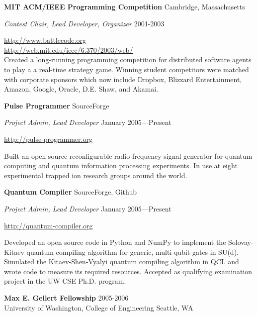 \documentclass[letter]{article}
\begin{document}
\vspace{\baselineskip}

{\bf MIT ACM/IEEE Programming Competition} \hfill Cambridge, Massachusetts

{\em Contest Chair, Lead Developer, Organizer} \hfill 2001-2003
\vspace{0.5\baselineskip}
\par

\url{http://www.battlecode.org}\\
\url{http://web.mit.edu/ieee/6.370/2003/web/}\\
Created a long-running
programming competition for distributed software agents to play a
a real-time strategy game. Winning student competitors were matched with
corporate sponsors which now include
Dropbox, Blizzard Entertainment, Amazon, Google, Oracle, D.E. Shaw, and Akamai.

\vspace{\baselineskip}
\par
{\bf {Pulse Programmer}} \hfill SourceForge
\par
{\em Project Admin, Lead Developer} \hfill January 2005---Present
\par
\url{http://pulse-programmer.org}
\par
Built an open source reconfigurable radio-frequency signal generator
for quantum computing and quantum information processing experiments.
In use at eight experimental trapped ion research groups around the world.

\vspace{\baselineskip}
\par
{\bf {Quantum Compiler}} \hfill SourceForge, Github
\par
{\em Project Admin, Lead Developer} \hfill January 2005---Present
\par
\url{http://quantum-compiler.org}
\par
Developed an open source code in Python and NumPy to implement the
Solovay-Kitaev quantum compiling algorithm for generic, multi-qubit gates
in SU(d). Simulated the Kitaev-Shen-Vyalyi quantum compiling algorithm in
QCL and wrote code to measure its required resources. Accepted as
qualifying examination project in the UW CSE Ph.D. program.

\vspace{\baselineskip}
\par
{\bf {Max E. Gellert Fellowship}} \hfill 2005-2006\\
University of Washington, College of Engineering \hfill Seattle, WA
\end{document}
